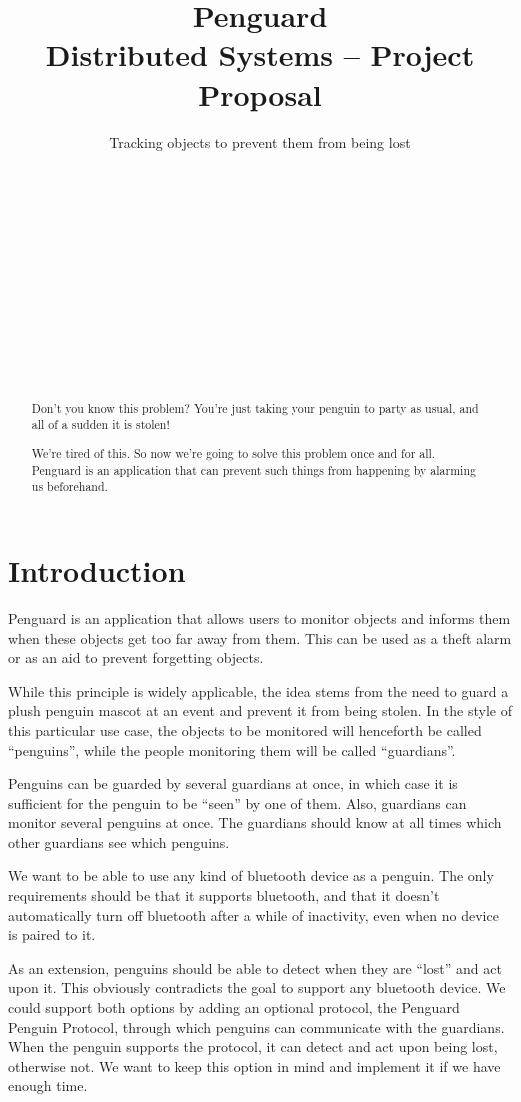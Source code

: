\documentclass{report}
\title{Penguard\\
\normalsize{Distributed Systems -- Project Proposal}}
\subtitle{Tracking objects to prevent them from being lost}
\author{
\alignauthor {\normalsize Nils Leuzinger}\\
	\affaddr{{\normalsize 14-939-896}}\\
	\email{{\normalsize nilsl@student.ethz.ch}}
\alignauthor {\normalsize Nicole Thurnherr}\\
	\affaddr{{\normalsize 11-925-328}}\\
	\email{{\normalsize nicoleth@student.ethz.ch}}
\alignauthor {\normalsize Aline Abler}\\
	\affaddr{{\normalsize 14-920-979}}\\
	\email{{\normalsize ablera@student.ethz.ch}}
\and
\alignauthor {\normalsize Sascha Tribelhorn}\\
	\affaddr{{\normalsize 13-914-692}}\\
	\email{{\normalsize tsascha@student.ethz.ch}}
\alignauthor {\normalsize Luca Wolf}\\
	\affaddr{{\normalsize 12-913-539}}\\
	\email{{\normalsize lwolf@student.ethz.ch}}
}
\begin{document}
\maketitle

\begin{abstract}
Don't you know this problem? You're just taking your penguin to party as usual, and all of a sudden it is stolen! 

We're tired of this. So now we're going to solve this problem once and for all. Penguard is an application that can prevent such things from happening by alarming us beforehand.
\end{abstract}

\section{Introduction}

Penguard is an application that allows users to monitor objects and informs them when these objects get too far away from them. This can be used as a theft alarm or as an aid to prevent forgetting objects.

While this principle is widely applicable, the idea stems from the need to guard a plush penguin mascot at an event and prevent it from being stolen. In the style of this particular use case, the objects to be monitored will henceforth be called ``penguins'', while the people monitoring them will be called ``guardians''.

Penguins can be guarded by several guardians at once, in which case it is sufficient for the penguin to be ``seen'' by one of them. Also, guardians can monitor several penguins at once. The guardians should know at all times which other guardians see which penguins.

We want to be able to use any kind of bluetooth device as a penguin. The only requirements should be that it supports bluetooth, and that it doesn't automatically turn off bluetooth after a while of inactivity, even when no device is paired to it.

As an extension, penguins should be able to detect when they are ``lost'' and act upon it. This obviously contradicts the goal to support any bluetooth device. We could support both options by adding an optional protocol, the Penguard Penguin Protocol, through which penguins can communicate with the guardians. When the penguin supports the protocol, it can detect and act upon being lost, otherwise not. We want to keep this option in mind and implement it if we have enough time.
\end{document}
